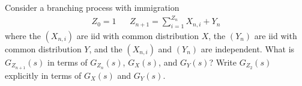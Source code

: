 \documentclass[10pt]{article}
\begin{document}
\begin{solution}[Solution]
    
\end{solution}


\begin{problem}[Exercise 3.4]
Consider a branching process with immigration
\begin{align*}
    Z_0=1 && Z_{n+1}=\sum_{i=1}^{Z_n}X_{n,i}+Y_n
\end{align*}
where the \( (X_{n,i}) \) are iid with common distribution \( X \), the \( (Y_n) \) are iid with common distribution \( Y \), and the \( (X_{n,i}) \) and \( (Y_n) \) are independent. What is \( G_{Z_{n+1}}(s) \) in terms of \( G_{Z_n}(s)\), \( G_X(s) \), and \( G_Y(s) \)? Write \( G_{Z_2}(s) \) explicitly in terms of \( G_X(s) \) and \( G_Y(s) \).
\end{problem}
\end{document}
